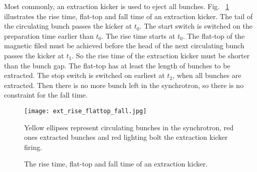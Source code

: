 %		  
%


Most commonly, an extraction kicker is used to eject all bunches. Fig. ~\ref{ext_rise_flattop_fall} illustrates the rise time, flat-top and fall time of an extraction kicker. The tail of the circulating bunch passes the kicker at $t_0$. The start switch is switched on the preparation time earlier than $t_0$. The rise time starts at $t_0$. The flat-top of the magnetic filed must be achieved before the head of the next circulating bunch passes the kicker at $t_1$. So the rise time of the extraction kicker must be shorter than the bunch gap. The flat-top has at least the length of bunches to be extracted. The stop switch is switched on earliest at $t_2$, when all bunches are extracted. Then there is no more bunch left in the synchrotron, so there is no constraint for the fall time. 

\begin{figure}[!htb]
   \centering   
   \texttt{[image: ext\_rise\_flattop\_fall.jpg]}
   \caption{The rise time, flat-top and fall time of an extraction kicker.}{Yellow ellipses represent circulating bunches in the synchrotron, red ones extracted bunches and red lighting bolt the extraction kicker firing.}
   \label{ext_rise_flattop_fall}
\end{figure}
 
